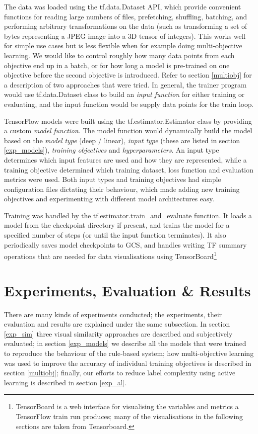 The data was loaded using the tf.data.Dataset API, which provide convenient functions for reading large numbers of files, prefetching, shuffling, batching, and performing arbitrary transformations on the data (such as transforming a set of bytes representing a JPEG image into a 3D tensor of integers).
This works well for simple use cases but is less flexible when for example doing multi-objective learning.
We would like to control roughly how many data points from each objective end up in a batch, or for how long a model is pre-trained on one objective before the second objective is introduced.
Refer to section \ref{multiobj} for a description of two approaches that were tried.
In general, the trainer program would use tf.data.Dataset class to build an \textit{input function} for either training or evaluating, and the input function would be supply data points for the train loop.

TensorFlow models were built using the tf.estimator.Estimator class by providing a custom \textit{model function}.
The model function would dynamically build the model based on the \textit{model type} (deep / linear), \textit{input type} (these are listed in section \ref{exp_models}), \textit{training objectives} and \textit{hyperparameters}.
An input type determines which input features are used and how they are represented, while a training objective determined which training dataset, loss function and evaluation metrics were used.
Both input types and training objectives had simple configuration files dictating their behaviour, which made adding new training objectives and experimenting with different model architectures easy.

Training was handled by the tf.estimator.train\_and\_evaluate function.
It loads a model from the checkpoint directory if present, and trains the model for a specified number of steps (or until the input function terminates).
It also periodically saves model checkpoints to GCS, and handles writing TF summary operations that are needed for data visualisations using TensorBoard\footnote{TensorBoard is a web interface for visualising the variables and metrics a TensorFlow train run produces; many of the visualisations in the following sections are taken from Tensorboard.}

\section{Experiments, Evaluation \& Results}
\label{exp}

There are many kinds of experiments conducted; the experiments, their evaluation and results are explained under the same subsection.
In section \ref{exp_sim} three visual similarity approaches are described and subjectively evaluated;
in section \ref{exp_models} we describe all the models that were trained to reproduce the behaviour of the rule-based system;
how multi-objective learning was used to improve the accuracy of individual training objectives is described in section \ref{multiobj};
finally, our efforts to reduce label complexity using active learning is described in section \ref{exp_al}.

